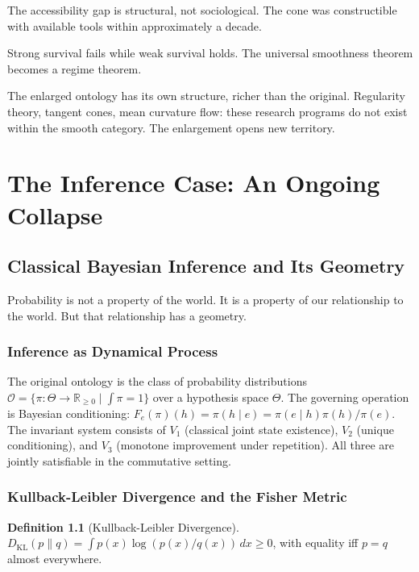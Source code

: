 \documentclass[12pt,oneside]{book}
\theoremstyle{plain}
\theoremstyle{definition}
\newtheorem{definition}[theorem]{Definition}
\theoremstyle{remark}
\newcommand{\Oold}{\mathcal{O}}
\newcommand{\KL}{D_{\mathrm{KL}}}
\newcommand{\Real}{\mathbb{R}}
\begin{document}
The accessibility gap is structural, not sociological. The cone was
constructible with available tools within approximately a decade.

Strong survival fails while weak survival holds. The universal smoothness
theorem becomes a regime theorem.

The enlarged ontology has its own structure, richer than the original.
Regularity theory, tangent cones, mean curvature flow: these research programs
do not exist within the smooth category. The enlargement opens new territory.

\part{The Inference Case: An Ongoing Collapse}

\chapter{Classical Bayesian Inference and Its Geometry}

\epigraph{Probability is not a property of the world. It is a property of
our relationship to the world. But that relationship has a geometry.}{}

\section{Inference as Dynamical Process}

The original ontology is the class of probability distributions $\Oold =
\{\pi : \Theta \to \Real_{\geq 0} \mid \int\pi = 1\}$ over a hypothesis
space $\Theta$. The governing operation is Bayesian conditioning:
$F_e(\pi)(h) = \pi(h \mid e) = \pi(e \mid h)\pi(h)/\pi(e)$. The invariant
system consists of $V_1$ (classical joint state existence), $V_2$ (unique
conditioning), and $V_3$ (monotone improvement under repetition). All three
are jointly satisfiable in the commutative setting.

\section{Kullback-Leibler Divergence and the Fisher Metric}

\begin{definition}[Kullback-Leibler Divergence]
$\KL(p \| q) = \int p(x)\log(p(x)/q(x))\, dx \geq 0$, with equality iff
$p = q$ almost everywhere.
\end{definition}
\end{document}
